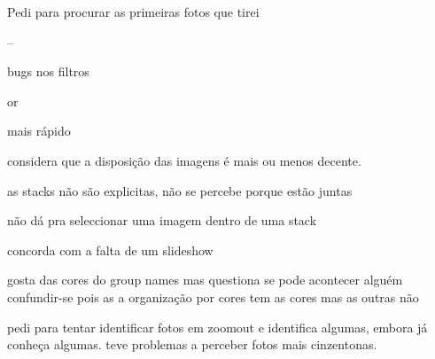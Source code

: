 \begin{myitemize}
	\item Pedi para procurar as primeiras fotos que tirei



	\item --


	\item bugs nos filtros

	\item or

	\item mais rápido

	\item considera que a disposição das imagens é mais ou menos decente.

	\item as stacks não são explicitas, não se percebe porque estão juntas

	\item não dá pra seleccionar uma imagem dentro de uma stack

	\item concorda com a falta de um slideshow

	\item gosta das cores do group names mas questiona se pode acontecer alguém confundir-se pois as a organização por cores tem as cores mas as outras não


	\item pedi para tentar identificar fotos em zoomout e identifica algumas, embora já conheça algumas. teve problemas a perceber fotos mais cinzentonas.

\end{myitemize}




